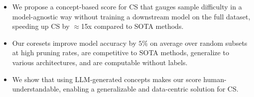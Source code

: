 \begin{itemize}
    \item We propose a concept-based score for CS that gauges sample difficulty in a model-agnostic way without training a downstream model on the full dataset, speeding up CS by $\approx$15x compared to SOTA methods.
    
    

    


    \item Our coresets improve model accuracy by $5$\% on average over random subsets at high pruning rates, are competitive to SOTA methods, generalize to various architectures, and are computable without labels.
    

    \item We show that using LLM-generated concepts makes our score human-understandable, enabling a generalizable and data-centric solution for CS. 
    

\end{itemize}
